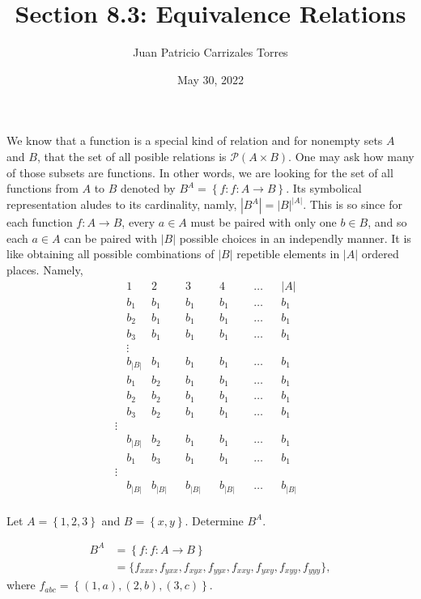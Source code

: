 \documentclass[12pt]{article}
\newenvironment{problem}[2][Problem]{\begin{trivlist} \item[\hskip \labelsep {\bfseries #1}\hskip \labelsep {\bfseries #2.}]}{\end{trivlist}}
\newenvironment{solution}[1][Solution]{\begin{trivlist} \item[\hskip \labelsep {\bfseries #1}]}{\end{trivlist}}
\begin{document}
  
 \title{Section 8.3: Equivalence Relations}
   \author{Juan Patricio Carrizales Torres}
     \date{May 30, 2022}
       \maketitle

       We know that a function is a special kind of relation and for nonempty sets $A$ and $B$, that the set of all posible relations is $\mathcal{P}(A\times B)$. One may ask how many of those subsets are functions. In other words, we are looking for the set of all functions from $A$ to $B$ denoted by $B^{A}=\left\{ f:f:A\to B \right\}$. Its symbolical representation aludes to its cardinality, namly, $|B^{A}| = |B|^{|A|}$.
       This is so since for each function $f:A\to B$, every $a\in A$ must be paired with only one $b\in B$, and so each $a\in A$ can be paired with $|B|$ possible choices in an independly manner. It is like obtaining all possible combinations of $|B|$ repetible elements in $|A|$ ordered places. Namely,
    \begin{align*}
      &1 &2& &3& &4& &\dots& &|A|&\\
      &b_{1} &b_{1}& &b_{1}& &b_{1}& &\dots& &b_{1}\\
      &b_{2} &b_{1}& &b_{1}& &b_{1}& &\dots& &b_{1}\\
      &b_{3} &b_{1}& &b_{1}& &b_{1}& &\dots& &b_{1}\\
      &\vdots\\
      &b_{|B|} &b_{1}& &b_{1}& &b_{1}& &\dots& &b_{1}\\
      &b_{1} &b_{2}& &b_{1}& &b_{1}& &\dots& &b_{1}\\
      &b_{2} &b_{2}& &b_{1}& &b_{1}& &\dots& &b_{1}\\
      &b_{3} &b_{2}& &b_{1}& &b_{1}& &\dots& &b_{1}\\
      \vdots\\
      &b_{|B|} &b_{2}& &b_{1}& &b_{1}& &\dots& &b_{1}\\
      &b_{1} &b_{3}& &b_{1}& &b_{1}& &\dots& &b_{1}\\
      \vdots\\
      &b_{|B|} &b_{|B|}& &b_{|B|}& &b_{|B|}& &\dots& &b_{|B|}\\
    \end{align*}
    \begin{problem}{13}
      Let $A=\left\{ 1,2,3 \right\}$ and $B=\left\{ x,y \right\}$. Determine $B^{A}$.
    \begin{solution}
    \begin{align*}
      B^{A} &= \left\{ f:f:A\to B \right\}\\
      &= \{f_{xxx},f_{yxx}, f_{xyx}, f_{yyx}, f_{xxy}, f_{yxy}, f_{xyy},f_{yyy}\},
    \end{align*}
    where $f_{abc} = \left\{ (1,a),(2,b),(3,c) \right\}$.
    \end{solution}
    \end{problem}
\end{document}
